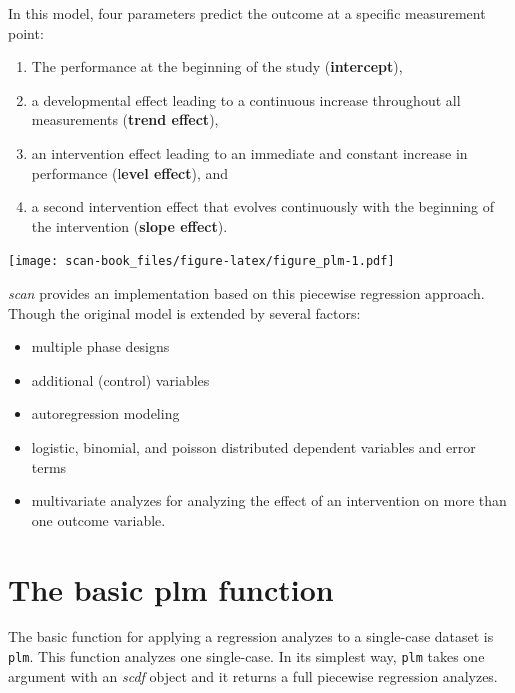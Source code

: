\documentclass[
]{book}
\newenvironment{Shaded}{\begin{snugshade}}{\end{snugshade}}
\newcommand{\FunctionTok}[1]{\textcolor[rgb]{0.00,0.00,0.00}{#1}}
\newcommand{\NormalTok}[1]{#1}
\newcommand{\SpecialCharTok}[1]{\textcolor[rgb]{0.00,0.00,0.00}{#1}}
\providecommand{\tightlist}{%
  \setlength{\itemsep}{0pt}\setlength{\parskip}{0pt}}
\begin{document}
In this model, four parameters predict the outcome at a specific measurement point:

\begin{enumerate}
\def\labelenumi{\arabic{enumi}.}
\item
  The performance at the beginning of the study (\textbf{intercept}),
\item
  a developmental effect leading to a continuous increase throughout all measurements (\textbf{trend effect}),
\item
  an intervention effect leading to an immediate and constant increase in performance (l\textbf{evel effect}), and
\item
  a second intervention effect that evolves continuously with the beginning of the intervention (\textbf{slope effect}).
\end{enumerate}

\texttt{[image: scan-book\_files/figure-latex/figure\_plm-1.pdf]}

\emph{scan} provides an implementation based on this piecewise regression approach. Though the original model is extended by several factors:

\begin{itemize}
\tightlist
\item
  multiple phase designs
\item
  additional (control) variables
\item
  autoregression modeling
\item
  logistic, binomial, and poisson distributed dependent variables and error terms
\item
  multivariate analyzes for analyzing the effect of an intervention on more than one outcome variable.
\end{itemize}

\hypertarget{the-basic-plm-function}{%
\section{The basic plm function}\label{the-basic-plm-function}}

The basic function for applying a regression analyzes to a single-case dataset is \texttt{plm}. This function analyzes one single-case. In its simplest way, \texttt{plm} takes one argument with an \emph{scdf} object and it returns a full piecewise regression analyzes.

\begin{Shaded}
\end{Shaded}
\end{document}
